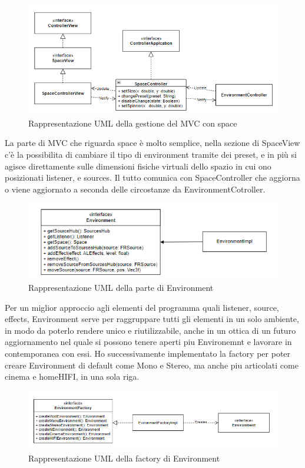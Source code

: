 \documentclass[a4paper,12pt]{report}
\begin{document}
%
\begin{figure}[H]
\centering{}
\includegraphics[width=\textwidth]{img/space/SpaceMVC.png}
\caption{Rappresentazione UML della gestione del MVC con space}
\label{img:spacemvc}
\end{figure}
La parte di MVC che riguarda space è molto semplice, nella sezione di SpaceView c'è  la possibilita di cambiare il tipo di environment tramite dei preset, e in più si agisce direttamente sulle dimensioni fisiche virtuali dello spazio in cui ono posizionati listener, e sources. Il tutto comunica con SpaceController che aggiorna o viene aggiornato a seconda delle circostanze da EnvironmentCotroller.
%
\begin{figure}[H]
\centering{}
\includegraphics[width=\textwidth]{img/environment/Environment.png}
\caption{Rappresentazione UML della parte di Environment}
\label{img:environment}
\end{figure}
Per un miglior approccio agli elementi del programma quali listener, source, effects, Environment serve per raggruppare tutti gli elementi in un solo ambiente, in modo da poterlo rendere unico e riutilizzabile, anche in un ottica di un futuro aggiornamento nel quale si possono tenere aperti piu Environemnt e lavorare in contemporanea con essi.
Ho successivamente implementato la factory per poter creare Environment di default come Mono e Stereo, ma anche piu articolati come cinema e homeHIFI, in una sola riga.
%
\begin{figure}[H]
\centering{}
\includegraphics[width=\textwidth]{img/environment/EnvironmentFactory.png}
\caption{Rappresentazione UML della factory di Environment}
\label{img:environmentfactory}
\end{figure}
\end{document}
